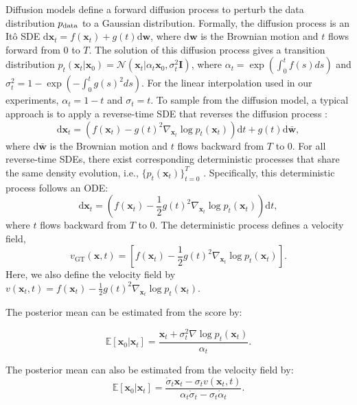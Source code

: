 \documentclass{article}
\theoremstyle{plain}
\theoremstyle{definition}
\theoremstyle{remark}
\def\cN{{\mathcal{N}}}
\def\vx{{\bm{x}}}
\begin{document}
Diffusion models define a forward diffusion process to perturb the data distribution $p_{\rm data}$ to a Gaussian distribution. Formally, the diffusion process is an Itô SDE $\mathrm{d}\vx_t=f(\vx_t)+g(t)\mathrm{d}\mathbf{w}$, where $\mathrm{d}\mathbf{w}$ is the Brownian motion and $t$ flows forward from $0$ to $T$. The solution of this diffusion process gives a transition distribution $p_t(\vx_t|\vx_0)=\cN(\vx_t|\alpha_t\vx_0,\sigma^2_t\bm{I})$, where $\alpha_t=\exp\left({\int_0^t f(s)ds}\right)$ and $\sigma_t^2=1-\exp\left({-\int_0^t g(s)^2ds}\right)$. For the linear interpolation used in our experiments, $\alpha_t=1-t$ and $\sigma_t=t$. To sample from the diffusion model, a typical approach is to apply a reverse-time SDE that reverses the diffusion process \cite{anderson1982reversesde}:
\begin{equation*}
    \mathrm{d}\vx_t=\left(f(\vx_t)-g(t)^2\nabla_{\vx_t} \log p_t(\vx_t)\right)\mathrm{d}t+g(t)\mathrm{d}\bar{\mathbf{w}},
\end{equation*}
where $\mathrm{d}\bar{\mathbf{w}}$ is the Brownian motion and $t$ flows backward from $T$ to $0$. For all reverse-time SDEs, there exist corresponding deterministic processes that share the same density evolution, i.e., $\{p_t(\bm x_t)\}_{t=0}^T$ \cite{song2020score}. Specifically, this deterministic process follows an ODE:
\begin{equation*}
    \mathrm{d}\vx_t=\left(f(\vx_t)-\frac{1}{2}g(t)^2\nabla_{\vx_t} \log p_t(\vx_t)\right)\mathrm{d}t,
\end{equation*}
 where $t$ flows backward from $T$ to $0$. The deterministic process defines a velocity field,
\begin{equation*}
 v_{\text{GT}}(\vx,t)=[f(\vx_t)-\frac{1}{2}g(t)^2\nabla_{\vx_t} \log p_t(\vx_t)].
\end{equation*}
Here, we also define the velocity field by $v(\vx_t,t)=f(\vx_t)-\frac{1}{2}g(t)^2\nabla_{\vx_t} \log p_t(\vx_t)$.

The posterior mean can be estimated from the score by:

\begin{equation*}
 \mathbb{E}[\vx_0|\vx_t]=\frac{\vx_t + \sigma_t^2 \nabla \log p_t(\vx_t)}{\alpha_t}.
\end{equation*}

The posterior mean can also be estimated from the velocity field by:
\begin{equation*}
 \mathbb{E}[\vx_0|\vx_t]=\frac{\dot{\sigma}_t \vx_t - \sigma_t v(\vx_t,t)}{\alpha_t\dot{\sigma}_t-\sigma_t\dot{\alpha}_t}.
\end{equation*}
\end{document}
